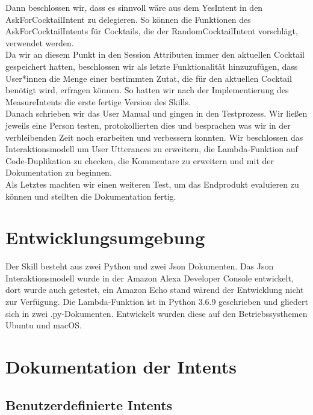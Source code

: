 \documentclass[12pt,letterpaper]{article}
\begin{document}
Dann beschlossen wir, dass es sinnvoll wäre aus dem YesIntent in den AskForCocktailIntent zu delegieren. So können die Funktionen des AskForCocktailIntents für Cocktails, die der RandomCocktailIntent vorschlägt, verwendet werden. \\ 
Da wir an diesem Punkt in den Session Attributen immer den aktuellen Cocktail gespeichert hatten, beschlossen wir als letzte Funktionalität hinzuzufügen, dass User*innen die Menge einer bestimmten Zutat, die für den aktuellen Cocktail benötigt wird, erfragen können. So hatten wir nach der Implementierung des MeasureIntents die erste fertige Version des Skills. \\
Danach schrieben wir das User Manual und gingen in den Testprozess. Wir ließen jeweils eine Person testen, protokollierten dies und besprachen was wir in der verbleibenden Zeit noch erarbeiten und verbessern konnten. Wir beschlossen das Interaktionsmodell um User Utterances zu erweitern, die Lambda-Funktion auf Code-Duplikation zu checken, die Kommentare zu erweitern und mit der Dokumentation zu beginnen. \\
Als Letztes machten wir einen weiteren Test, um das Endprodukt evaluieren zu können und stellten die Dokumentation fertig.

\section{Entwicklungsumgebung}
Der Skill besteht aus zwei Python und zwei Json Dokumenten.
Das Json Interaktionsmodell wurde in der Amazon Alexa Developer Console entwickelt, dort wurde auch getestet, ein Amazon Echo stand wärend der Entwicklung nicht zur Verfügung. Die Lambda-Funktion ist in Python 3.6.9 geschrieben und gliedert sich in zwei .py-Dokumenten. Entwickelt wurden diese auf den Betriebssysthemen Ubuntu und macOS.

\section{Dokumentation der Intents}
\subsection{Benutzerdefinierte Intents}
\end{document}
